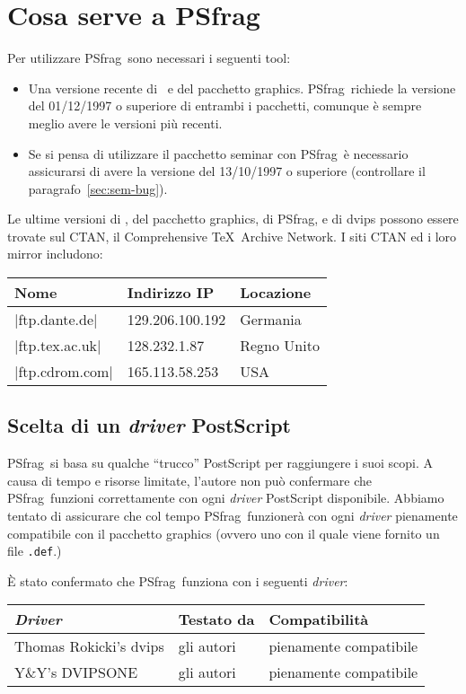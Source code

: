 \documentclass[a4paper,11pt]{ltxguide}
\let\pkg\textsf
\let\fname\texttt
\newcommand{\pfg}{\pkg{PSfrag}}
\begin{document}
\section{Cosa serve a \pfg}

Per utilizzare \pfg\ sono necessari i seguenti tool:
\begin{itemize}
\item Una versione recente di \LaTeXe\ e del pacchetto \pkg{graphics}.
  \pfg\ richiede la versione del 01/12/1997 o superiore di entrambi i
  pacchetti, comunque \`e sempre meglio avere le versioni pi\`u 
  recenti.
\item Se si pensa di utilizzare il pacchetto \pkg{seminar} con  \pfg\ 
  \`e necessario assicurarsi di avere la versione del 13/10/1997 
  o superiore (controllare il paragrafo~\ref{sec:sem-bug}).
\end{itemize}

Le ultime versioni di \LaTeXe, del pacchetto \pkg{graphics}, di \pfg, 
e di \pkg{dvips} possono essere trovate sul CTAN, il Comprehensive \TeX\ 
Archive Network. I siti CTAN ed i loro mirror includono:
\begin{center}
  \begin{tabular}{lll}
    Nome & Indirizzo IP  & Locazione \\ \hline
    |ftp.dante.de| & 129.206.100.192 & Germania \\
    |ftp.tex.ac.uk| & 128.232.1.87 & Regno Unito \\
    |ftp.cdrom.com| & 165.113.58.253 & USA \\
  \end{tabular}
\end{center}

\subsection{Scelta di un \emph{driver} PostScript}
\label{sec:compat}

\pfg\ si basa su qualche ``trucco'' PostScript per raggiungere i suoi scopi.
A causa di tempo e risorse limitate, l'autore non pu\`o confermare che
\pfg\ funzioni correttamente con ogni \emph{driver} PostScript disponibile. Abbiamo
tentato di assicurare che col tempo \pfg\ funzioner\`a con ogni \emph{driver} 
pienamente compatibile con il pacchetto \pkg{graphics} 
(ovvero uno con il quale viene fornito un file \fname{.def}.) 

\`E stato confermato che \pfg\  funziona con i seguenti \emph{driver}:
\begin{center}
\begin{tabular}{lll}
\emph{Driver} & Testato da & Compatibilit\`a \\ \hline
Thomas Rokicki's \pkg{dvips} & gli autori &
pienamente compatibile \\
Y\&Y's \pkg{DVIPSONE} & gli autori &
pienamente compatibile
\end{tabular}
\end{center}
\end{document}
